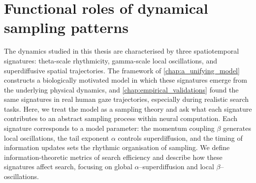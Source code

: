 \section{Functional roles of dynamical sampling patterns}\label{sec:functional_roles_of_dynamical_patterns}
The dynamics studied in this thesis are characterised by three spatiotemporal signatures: theta-scale rhythmicity, gamma-scale local oscillations, and superdiffusive spatial trajectories. The framework of \cref{chap:a_unifying_model} constructs a biologically motivated model in which these signatures emerge from the underlying physical dynamics, and \cref{chap:empirical_validations} found the same signatures in real human gaze trajectories, especially during realistic search tasks. Here, we treat the model as a sampling theory and ask what each signature contributes to an abstract sampling process within neural computation. Each signature corresponds to a model parameter: the momentum coupling $\beta$ generates local oscillations, the tail exponent $\alpha$ controls superdiffusion, and the timing of information updates sets the rhythmic organisation of sampling. We define information-theoretic metrics of search efficiency and describe how these signatures affect search, focusing on global $\alpha$--superdiffusion and local $\beta$--oscillations.
